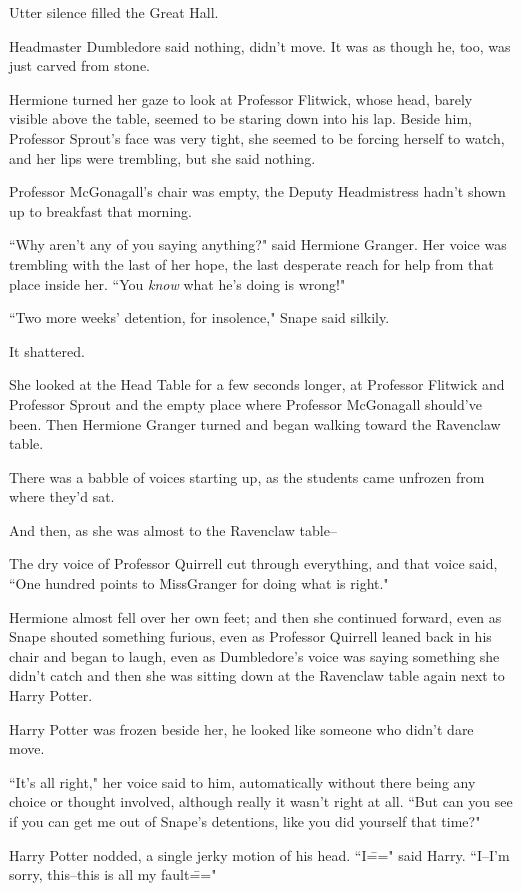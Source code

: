 Utter silence filled the Great Hall.

Headmaster Dumbledore said nothing, didn't move. It was as though he, too, was just carved from stone.

Hermione turned her gaze to look at Professor Flitwick, whose head, barely visible above the table, seemed to be staring down into his lap. Beside him, Professor Sprout's face was very tight, she seemed to be forcing herself to watch, and her lips were trembling, but she said nothing.

Professor McGonagall's chair was empty, the Deputy Headmistress hadn't shown up to breakfast that morning.

``Why aren't any of you saying anything?" said Hermione Granger. Her voice was trembling with the last of her hope, the last desperate reach for help from that place inside her. ``You \emph{know} what he's doing is wrong!"

``Two more weeks' detention, for insolence," Snape said silkily.

It shattered.

She looked at the Head Table for a few seconds longer, at Professor Flitwick and Professor Sprout and the empty place where Professor McGonagall should've been. Then Hermione Granger turned and began walking toward the Ravenclaw table.

There was a babble of voices starting up, as the students came unfrozen from where they'd sat.

And then, as she was almost to the Ravenclaw table\---

The dry voice of Professor Quirrell cut through everything, and that voice said, ``One hundred points to Miss\?Granger for doing what is right."

Hermione almost fell over her own feet; and then she continued forward, even as Snape shouted something furious, even as Professor Quirrell leaned back in his chair and began to laugh, even as Dumbledore's voice was saying something she didn't catch and then she was sitting down at the Ravenclaw table again next to Harry Potter.

Harry Potter was frozen beside her, he looked like someone who didn't dare move.

``It's all right," her voice said to him, automatically without there being any choice or thought involved, although really it wasn't right at all. ``But can you see if you can get me out of Snape's detentions, like you did yourself that time?"

Harry Potter nodded, a single jerky motion of his head. ``I\===" said Harry. ``I\---I'm sorry, this\---this is all my fault\==="

